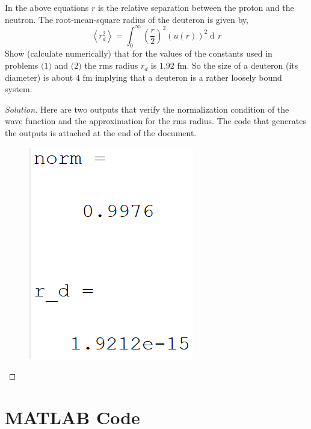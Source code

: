 \documentclass[12pt]{article}
\newcommand{\avg}[1]{\left< #1 \right>} %
\renewcommand{\=}[1]{\stackrel{#1}{=}} %
\DeclareMathOperator{\di}{d\!}
\newenvironment{problem}[2][Problem]{\begin{trivlist}
\item[\hskip \labelsep {\bfseries #1}\hskip \labelsep {\bfseries #2.}]}{\end{trivlist}}
\newenvironment{solution}{\begin{proof}[Solution]}{\end{proof}}
\begin{document}
    \begin{problem}{3}
        In the above equations $r$ is the relative separation between the proton and the neutron. The root-mean-square radius of the deuteron is given by,
        $$
        \avg{r_d^2} = \int_0^\infty \left(\frac{r}{2}\right)^2 \left(u(r)\right)^2 \di r
        $$
        Show (calculate numerically) that for the values of the constants used in problems $\text{(1)}$ and $\text{(2)}$ the rms radius $r_d$ is $1.92 \text{ fm}$. So the size of a deuteron (its diameter) is about $4 \text{ fm}$ implying that a deuteron is a rather loosely bound system.
    \end{problem}
    \begin{solution}
        Here are two outputs that verify the normalization condition of the wave function and the approximation for the rms radius. The code that generates the outputs is attached at the end of the document.
        \begin{figure}[h!]
            \includegraphics[scale=0.75]{output.PNG}
            \centering
        \end{figure}
    \end{solution}
    
    \pagebreak
    
    \section*{MATLAB Code}
        
\end{document}
